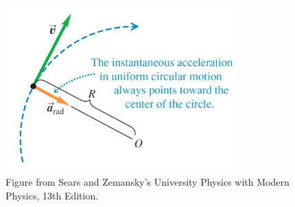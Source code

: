 \documentclass[]{beamer}
\begin{document}




\begin{frame}

    \begin{figure}[h!]  
        \includegraphics[width=0.8\textwidth]{images/28.jpg}
        \caption{ {\tiny Figure from Sears and Zemansky's University Physics 
        with Modern Physics, 13th Edition.} }
      \end{figure}
      
      
      
     
       \end{frame}
       

\end{document}
